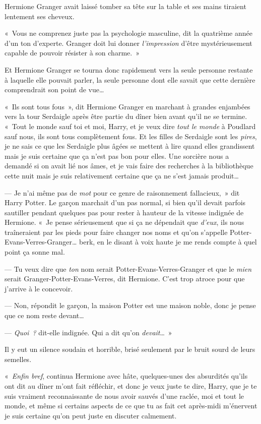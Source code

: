 Hermione Granger avait laissé tomber sa tête sur la table et ses mains tiraient lentement ses cheveux.

«~Vous ne comprenez juste pas la psychologie masculine, dit la quatrième année d'un ton d'experte.
Granger doit lui donner \emph{l'impression} d'être mystérieusement capable de pouvoir résister à son charme.~»


Et Hermione Granger se tourna donc rapidement vers la seule personne restante à laquelle elle pouvait parler, la seule personne dont elle savait que cette dernière comprendrait son point de vue…

«~Ils sont tous fous~», dit Hermione Granger en marchant à grandes enjambées vers la tour Serdaigle après être partie du dîner bien avant qu'il ne se termine.
«~Tout le monde sauf toi et moi, Harry, et je veux dire \emph{tout le monde} à Poudlard sauf nous, ils sont tous complètement fous.
Et les filles de Serdaigle sont les \emph{pires}, je ne sais ce que les Serdaigle plus âgées se mettent à lire quand elles grandissent mais je suis certaine que ça n'est pas bon pour elles.
Une sorcière nous a demandé si on avait lié nos âmes, et je vais faire des recherches à la bibliothèque cette nuit mais je suis relativement certaine que ça ne s'est jamais produit…

--- Je n'ai même pas de \emph{mot} pour ce genre de raisonnement fallacieux,~» dit Harry Potter.
Le garçon marchait d'un pas normal, si bien qu'il devait parfois sautiller pendant quelques pas pour rester à hauteur de la vitesse indignée de Hermione.
«~Je pense sérieusement que si ça ne dépendait que \emph{d'eux}, ils nous traîneraient par les pieds pour faire changer nos noms et qu'on s'appelle Potter-Evans-Verres-Granger… berk, en le disant à voix haute je me rends compte à quel point ça sonne mal.

--- Tu veux dire que \emph{ton} nom serait Potter-Evans-Verres-Granger et que le \emph{mien} serait Granger-Potter-Evans-Verres, dit Hermione.
C'est trop atroce pour que j'arrive à le concevoir.

--- Non, répondit le garçon, la maison Potter est une maison noble, donc je pense que ce nom reste devant…

--- \emph{Quoi~?} dit-elle indignée.
Qui a dit qu'on \emph{devait}…~»

Il y eut un silence soudain et horrible, brisé seulement par le bruit sourd de leurs semelles.

«~\emph{Enfin bref}, continua Hermione avec hâte, quelques-unes des absurdités qu'ils ont dit au dîner m'ont fait réfléchir, et donc je veux juste te dire, Harry, que je te suis vraiment reconnaissante de nous avoir sauvés d'une raclée, moi et tout le monde, et même si certains aspects de ce que tu as fait cet après-midi m'énervent je suis certaine qu'on peut juste en discuter calmement.

